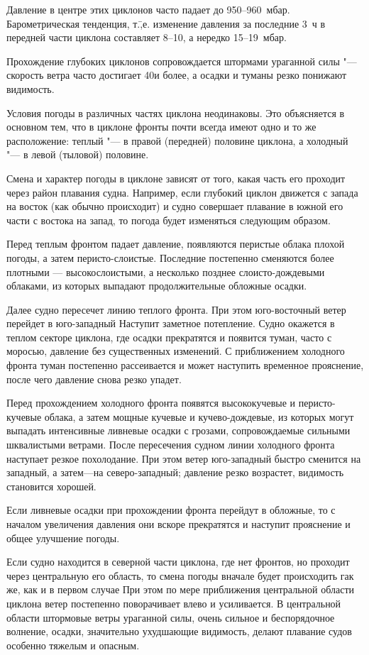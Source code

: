 Давление в центре этих циклонов часто падает до 950--960~мбар.
Барометрическая тенденция, т.\=,е. изменение давления за
последние 3~ч в передней части циклона составляет 8--10, а нередко
15--19~мбар.

Прохождение глубоких циклонов сопровождается штормами ураганной силы "---
скорость ветра часто достигает 40\speedms и более, а осадки и туманы
резко понижают видимость.

Условия погоды в различных частях циклона неодинаковы. Это объясняется
в основном тем, что в циклоне фронты почти всегда имеют одно и то же
расположение: теплый "--- в правой (передней) половине циклона, а
холодный "--- в левой (тыловой) половине.

Смена и характер погоды в циклоне зависят от того, какая часть его
проходит через район плавания судна. Например, если глубокий циклон
движется с запада на восток (как обычно происходит) и судно совершает
плавание в южной его части с востока на запад, то погода будет
изменяться следующим образом.

Перед теплым фронтом падает давление, появляются перистые облака плохой погоды, а затем перисто-слоистые. Последние постепенно сменяются более плотными — высокослоистыми, а несколько позднее слоисто-дождевыми облаками, из которых выпадают продолжительные обложные осадки.

Далее судно пересечет линию теплого фронта. При этом юго-восточный ветер перейдет в юго-западный Наступит заметное потепление. Судно окажется в теплом секторе циклона, где осадки прекратятся и появится туман, часто с моросью, давление без существенных изменений. С приближением холодного фронта туман постепенно рассеивается и может наступить временное прояснение, после чего давление снова резко упадет.

Перед прохождением холодного фронта появятся высококучевые и перисто-кучевые облака, а затем мощные кучевые и кучево-дождевые, из которых могут выпадать интенсивные ливневые осадки с грозами, сопровождаемые сильными шквалистыми ветрами. После пересечения судном линии холодного фронта наступает резкое похолодание. При этом ветер юго-западный быстро сменится на западный, а затем—на северо-западный; давление резко возрастет, видимость становится хорошей.

Если ливневые осадки при прохождении фронта перейдут в обложные, то с началом увеличения давления они вскоре прекратятся и наступит прояснение и общее улучшение погоды.

Если судно находится в северной части циклона, где нет фронтов, но проходит через центральную его область, то смена погоды вначале будет происходить гак же, как и в первом случае При этом по мере приближения центральной области циклона ветер постепенно поворачивает влево и усиливается. В центральной области штормовые ветры ураганной силы, очень сильное и беспорядочное волнение, осадки, значительно ухудшающие видимость, делают плавание судов особенно тяжелым и опасным.

